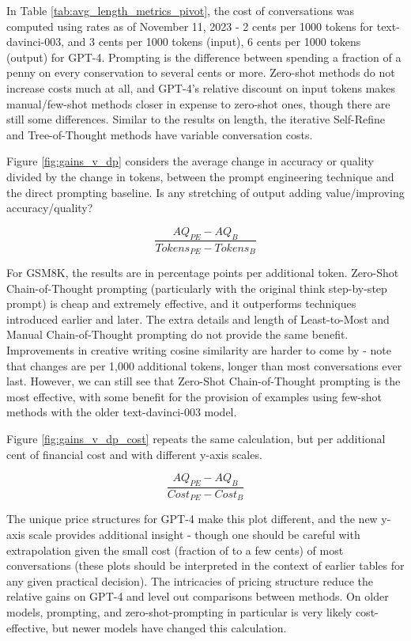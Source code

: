 \documentclass[11pt]{article}
\begin{document}
In Table \ref{tab:avg_length_metrics_pivot}, the cost of conversations was computed using rates as of November 11, 2023 - 2 cents per 1000 tokens for text-davinci-003, and 3 cents per 1000 tokens (input), 6 cents per 1000 tokens (output) for GPT-4. Prompting is the difference between spending a fraction of a penny on every conservation to several cents or more. Zero-shot methods do not increase costs much at all, and GPT-4's relative discount on input tokens makes manual/few-shot methods closer in expense to zero-shot ones, though there are still some differences. Similar to the results on length, the iterative Self-Refine and Tree-of-Thought methods have variable conversation costs.

Figure \ref{fig:gains_v_dp} considers the average change in accuracy or quality divided by the change in tokens, between the prompt engineering technique and the direct prompting baseline. Is any stretching of output adding value/improving accuracy/quality?

\begin{displaymath}
  \frac{AQ_{PE} - AQ_{B}}{Tokens_{PE} - Tokens_{B}}
\end{displaymath}

For GSM8K, the results are in percentage points per additional token. Zero-Shot Chain-of-Thought prompting (particularly with the original think step-by-step prompt) is cheap and extremely effective, and it outperforms techniques introduced earlier and later. The extra details and length of Least-to-Most and Manual Chain-of-Thought prompting do not provide the same benefit. Improvements in creative writing cosine similarity are harder to come by - note that changes are per 1,000 additional tokens, longer than most conversations ever last. However, we can still see that Zero-Shot Chain-of-Thought prompting is the most effective, with some benefit for the provision of examples using few-shot methods with the older text-davinci-003 model.

Figure \ref{fig:gains_v_dp_cost} repeats the same calculation, but per additional cent of financial cost and with different y-axis scales.

\begin{displaymath}
  \frac{AQ_{PE} - AQ_{B}}{Cost_{PE} - Cost_{B}}
\end{displaymath}

The unique price structures for GPT-4 make this plot different, and the new y-axis scale provides additional insight - though one should be careful with extrapolation given the small cost (fraction of to a few cents) of most conversations (these plots should be interpreted in the context of earlier tables for any given practical decision). The intricacies of pricing structure reduce the relative gains on GPT-4 and level out comparisons between methods. On older models, prompting, and zero-shot-prompting in particular is very likely cost-effective, but newer models have changed this calculation.
\end{document}
